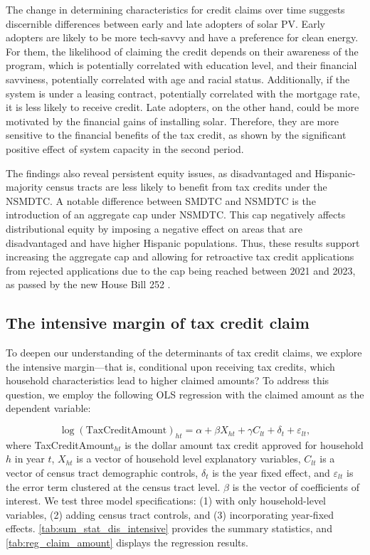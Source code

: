 \documentclass[11pt,twoside,letterpaper]{article}
\begin{document}
The change in determining characteristics for credit claims over time suggests discernible differences between early and late adopters of solar PV. Early adopters are likely to be more tech-savvy and have a preference for clean energy. For them, the likelihood of claiming the credit depends on their awareness of the program, which is potentially correlated with education level, and their financial savviness, potentially correlated with age and racial status. Additionally, if the system is under a leasing contract, potentially correlated with the mortgage rate, it is less likely to receive credit. Late adopters, on the other hand, could be more motivated by the financial gains of installing solar. Therefore, they are more sensitive to the financial benefits of the tax credit, as shown by the significant positive effect of system capacity in the second period.

The findings also reveal persistent equity issues, as disadvantaged and Hispanic-majority census tracts are less likely to benefit from tax credits under the NSMDTC. A notable difference between SMDTC and NSMDTC is the introduction of an aggregate cap under NSMDTC. This cap negatively affects distributional equity by imposing a negative effect on areas that are disadvantaged and have higher Hispanic populations. Thus, these results support increasing the aggregate cap and allowing for retroactive tax credit applications from rejected applications due to the cap being reached between 2021 and 2023, as passed by the new House Bill 252 \parencite{newsolarcap}. 

\subsection{The intensive margin of tax credit claim}

To deepen our understanding of the determinants of tax credit claims, we explore the intensive margin—that is, conditional upon receiving tax credits, which household characteristics lead to higher claimed amounts? To address this question, we employ the following OLS regression with the claimed amount as the dependent variable:

\begin{equation}\label{reg_4}
    \log(\text{TaxCreditAmount})_{ht} = \alpha + \beta X_{ht} + \gamma C_{lt}  + \delta_t + \varepsilon_{lt},
\end{equation}
where TaxCreditAmount$_{ht}$ is the dollar amount tax credit approved for household $h$ in year $t$, $X_{ht}$ is a vector of household level explanatory variables, $C_{lt}$ is a vector of census tract demographic controls, $\delta_t$ is the year fixed effect, and $\varepsilon_{lt}$ is the error term clustered at the census tract level. $\beta$ is the vector of coefficients of interest. We test three model specifications: (1) with only household-level variables, (2) adding census tract controls, and (3) incorporating year-fixed effects. \autoref{tab:sum_stat_dis_intensive} provides the summary statistics, and \autoref{tab:reg_claim_amount} displays the regression results.
\end{document}

